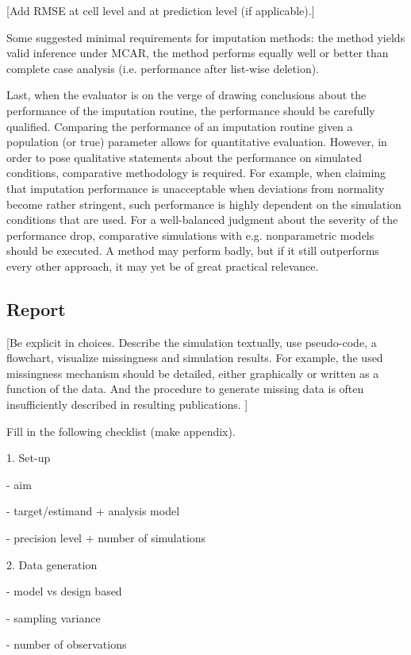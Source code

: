 \documentclass[bimj,fleqn]{w-art}
\begin{document}
[Add RMSE at cell level and at prediction level (if applicable).]

Some suggested minimal requirements for imputation methods: the method yields valid inference under MCAR, the method performs equally well or better than complete case analysis (i.e. performance after list-wise deletion).

Last, when the evaluator is on the verge of drawing conclusions about the performance of the imputation routine, the performance should be carefully qualified. Comparing the performance of an imputation routine given a population (or true) parameter allows for quantitative evaluation. However, in order to pose qualitative statements about the performance on simulated conditions, comparative methodology is required. For example, when claiming that imputation performance is unacceptable when deviations from normality become rather stringent, such performance is highly dependent on the simulation conditions that are used. For a well-balanced judgment about the severity of the performance drop, comparative simulations with e.g. nonparametric models should be executed. A method may perform badly, but if it still outperforms every other approach, it may yet be of great practical relevance.



\subsection{Report}

[Be explicit in choices. Describe the simulation textually, use pseudo-code, a flowchart, visualize missingness and simulation results. For example, the used missingness mechanism should be detailed, either graphically or written as a function of the data. And the procedure to generate missing data is often insufficiently described in resulting publications. ]


Fill in the following checklist (make appendix).

1. Set-up

- aim

- target/estimand + analysis model

- precision level + number of simulations

2. Data generation

- model vs design based

- sampling variance

- number of observations
\end{document}
